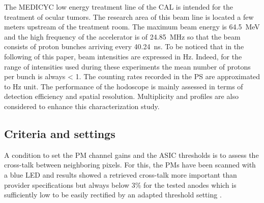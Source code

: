 \documentclass[a4paper,11pt]{article}
\begin{document}
The MEDICYC low energy treatment line of the CAL is intended for the treatment of ocular tumors. The research area of this beam line is located a few meters upstream of the treatment room. The maximum beam energy is 64.5~MeV and the high frequency of the accelerator is of 24.85~MHz so that the beam consists of proton bunches arriving every 40.24~ns. To be noticed that in the following of this paper, beam intensities are expressed in Hz. Indeed, for the range of intensities used during these experiments the mean number of protons per bunch is always < 1. The counting rates recorded in the PS are approximated to Hz unit.
The performance of the hodoscope is mainly assessed in terms of detection efficiency and spatial resolution. Multiplicity and profiles are also considered to enhance this characterization study.

\subsection{Criteria and settings}
\label{Settings}
A condition to set the PM channel gains and the ASIC thresholds is to assess the cross-talk between neighboring pixels. For this, the PMs have been scanned with a blue LED and results showed a retrieved cross-talk more important than provider specifications but always below 3\% for the tested anodes which is sufficiently low to be easily rectified by an adapted threshold setting \cite{FontanaPhD}.\\
\end{document}
